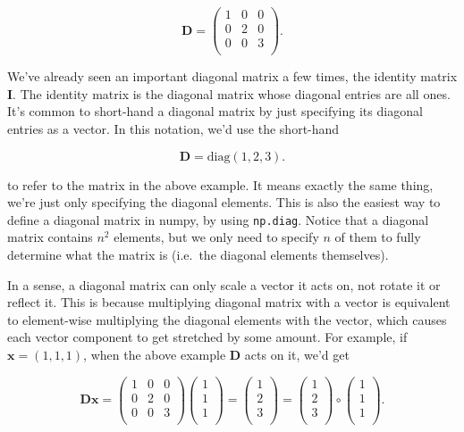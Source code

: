 \documentclass[
  letterpaper,
  DIV=11,
  numbers=noendperiod]{scrreprt}
\begin{document}
\[
\mathbf{D} = 
\begin{pmatrix}
1 & 0 & 0 \\
0 & 2 & 0 \\
0 & 0 & 3 \\
\end{pmatrix}.
\]

We've already seen an important diagonal matrix a few times, the
identity matrix \(\mathbf{I}\). The identity matrix is the diagonal
matrix whose diagonal entries are all ones. It's common to short-hand a
diagonal matrix by just specifying its diagonal entries as a vector. In
this notation, we'd use the short-hand

\[\mathbf{D} = \text{diag}(1,2,3).\]

to refer to the matrix in the above example. It means exactly the same
thing, we're just only specifying the diagonal elements. This is also
the easiest way to define a diagonal matrix in numpy, by using
\texttt{np.diag}. Notice that a diagonal matrix contains \(n^2\)
elements, but we only need to specify \(n\) of them to fully determine
what the matrix is (i.e.~the diagonal elements themselves).

In a sense, a diagonal matrix can only scale a vector it acts on, not
rotate it or reflect it. This is because multiplying diagonal matrix
with a vector is equivalent to element-wise multiplying the diagonal
elements with the vector, which causes each vector component to get
stretched by some amount. For example, if \(\mathbf{x}=(1,1,1)\), when
the above example \(\mathbf{D}\) acts on it, we'd get

\[
\mathbf{D}\mathbf{x} = 
\begin{pmatrix}
1 & 0 & 0 \\
0 & 2 & 0 \\
0 & 0 & 3 \\
\end{pmatrix}
\begin{pmatrix}
1 \\
1 \\
1 \\
\end{pmatrix} = 
\begin{pmatrix}
1 \\
2 \\
3 \\
\end{pmatrix} = 
\begin{pmatrix}
1 \\
2 \\
3 \\
\end{pmatrix} \circ 
\begin{pmatrix}
1 \\
1 \\
1 \\
\end{pmatrix}.
\]
\end{document}
